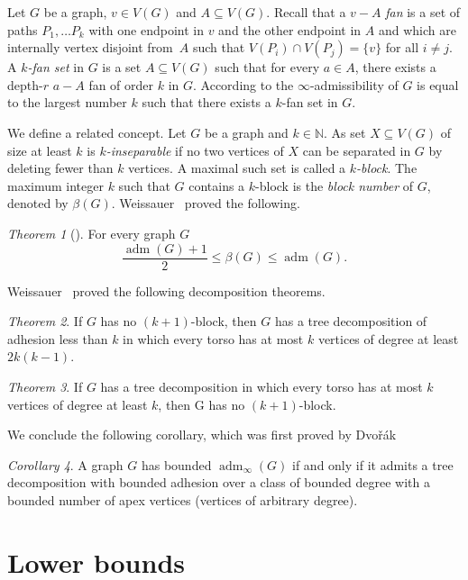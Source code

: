 \documentclass[1p,number,a4paper]{elsarticle}
\theoremstyle{remark}
\newcommand{\N}{\mathbb{N}}
\DeclareMathOperator{\adm}{adm}
\newtheorem{theorem}{Theorem}[section]
\newtheorem{corollary}[theorem]{Corollary}
\begin{document}
Let $G$ be a graph, $v\in V(G)$ and $A\subseteq V(G)$. Recall that a 
$v-A$ \emph{fan} is a 
set of paths $P_1,\ldots P_k$ with one endpoint in $v$ and the
other endpoint in $A$ and which are internally 
vertex disjoint from~$A$ 
such that $V(P_i)\cap V(P_j)=\{v\}$
for all $i\neq j$. 
A \emph{$k$-fan set} in $G$ is a set $A\subseteq V(G)$ 
such that for every $a\in A$, there exists a depth-$r$ 
$a-A$ fan of order $k$ in $G$. 
According to  the $\infty$-admissibility of $G$ is equal to the largest number $k$ such that there exists a $k$-fan set in $G$. 

We define a related concept. Let $G$ be a graph and $k\in \N$. As set $X\subseteq V(G)$ of size at least $k$ is \emph{$k$-inseparable} if no two vertices of $X$ can be separated in $G$ by deleting fewer than $k$ vertices. 
A maximal such set is called a \emph{$k$-block}. The maximum integer $k$
such that $G$ contains a $k$-block is the \emph{block number} of $G$, denoted by $\beta(G)$. 
Weissauer~\cite{weissauer2017block} proved the following.

\begin{theorem}[\cite{weissauer2017block}]\label{thm:blocks-adm}
  For every graph $G$
  \[ \frac{\adm(G)+1}{2}\leq \beta(G)\leq \adm(G).\]
  \end{theorem}

\pagebreak
Weissauer~\cite{weissauer2017block} proved the following decomposition theorems. 

\begin{theorem}
If $G$ has no $(k+1)$-block, then $G$ has a 
tree decomposition of adhesion less than $k$ in which every
torso has at most $k$ vertices of degree at least $2k(k-1)$. 
\end{theorem}

\begin{theorem}
If $G$ has a tree decomposition in which every torso has 
at most $k$ vertices of degree at least $k$, then G has no 
$(k+1)$-block.
\end{theorem}

We conclude the following corollary, which was first proved by Dvo\v{r}\'ak~\cite{dvorak2012stronger}
\begin{corollary}
    A graph $G$ has bounded $\adm_\infty(G)$ if and only if 
it admits a tree decomposition with bounded adhesion over 
a class of bounded degree with a bounded number of apex vertices (vertices of arbitrary degree). 
\end{corollary}

\section{Lower bounds}\label{sec:lower-bounds}
\end{document}
